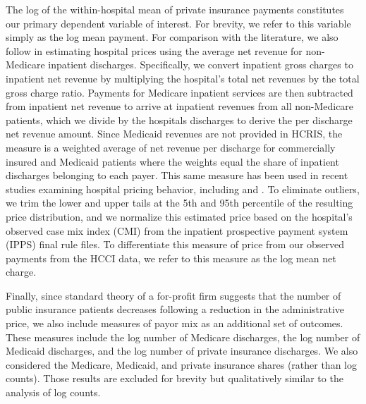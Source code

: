 \documentclass[12pt]{article}
\begin{document}
The log of the within-hospital mean of private insurance payments constitutes our primary dependent variable of interest. For brevity, we refer to this variable simply as the log mean payment. For comparison with the literature, we also follow \cite{dafny2009} in estimating hospital prices using the average net revenue for non-Medicare inpatient discharges. Specifically, we convert inpatient gross charges to inpatient net revenue by multiplying the hospital's total net revenues by the total gross charge ratio. Payments for Medicare inpatient services are then subtracted from inpatient net revenue to arrive at inpatient revenues from all non-Medicare patients, which we divide by the hospitals discharges to derive the per discharge net revenue amount. Since Medicaid revenues are not provided in HCRIS, the measure is a weighted average of net revenue per discharge for commercially insured and Medicaid patients where the weights equal the share of inpatient discharges belonging to each payer. This same measure has been used in recent studies examining hospital pricing behavior, including \cite{schmitt2017} and \cite{lewis2015}. To eliminate outliers, we trim the lower and upper tails at the 5th and 95th percentile of the resulting price distribution, and we normalize this estimated price based on the hospital's observed case mix index (CMI) from the inpatient prospective payment system (IPPS) final rule files. To differentiate this measure of price from our observed payments from the HCCI data, we refer to this measure as the log mean net charge.

Finally, since standard theory of a for-profit firm suggests that the number of public insurance patients decreases following a reduction in the administrative price, we also include measures of payor mix as an additional set of outcomes. These measures include the log number of Medicare discharges, the log number of Medicaid discharges, and the log number of private insurance discharges. We also considered the Medicare, Medicaid, and private insurance shares (rather than log counts). Those results are excluded for brevity but qualitatively similar to the analysis of log counts.
\end{document}
